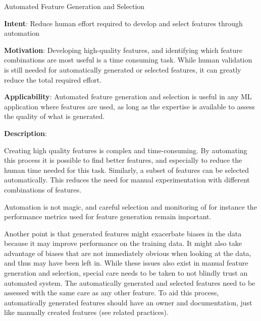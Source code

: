   
  \begin{frame}[plain]{ Automated Feature Generation and Selection
 }

  \textbf{Intent}: Reduce human effort required to develop and select features through automation 
 

  \textbf{Motivation}: Developing high-quality features, and identifying which feature combinations are most useful is a time consuming task. While human validation is still needed for automatically generated or selected features, it can greatly reduce the total required effort. 
 

  \textbf{Applicability}: Automated feature generation and selection is useful in any ML application where features are used, as long as the expertise is available to assess the quality of what is generated. 
 

  \textbf{Description}: 

Creating high quality features is complex and time-consuming. By automating this process it is possible to find better features, and especially to reduce the human time needed for this task. Similarly, a subset of features can be selected automatically. This reduces the need for manual experimentation with different combinations of features.


Automation is not magic, and careful selection and monitoring of for instance the performance metrics used for feature generation remain important.


Another point is that generated features might exacerbate biases in the data because it may improve performance on the training data. It might also take advantage of biases that are not immediately obvious when looking at the data, and thus may have been left in. While these issues also exist in manual feature generation and selection, special care needs to be taken to not blindly trust an automated system. The automatically generated and selected features need to be assessed with the same care as any other feature. To aid this process, automatically generated features should have an owner and documentation, just like manually created features (see related practices).


 


  \end{frame}

